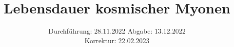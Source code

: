 

\subject{V01}
\title{Lebensdauer kosmischer Myonen}
\date{%
  Durchführung: 28.11.2022
  \hspace{3em}
  Abgabe: 13.12.2022\\
  \hspace{15.25em} Korrektur: 22.02.2023
}



\maketitle
\setcounter{page}{1}







\printbibliography{}


